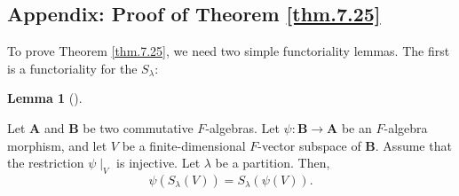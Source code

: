 \documentclass[numbers=enddot,12pt,final,onecolumn,notitlepage]{scrartcl}%
\numberwithin{exer}{section}
\theoremstyle{definition}
\newtheorem{lem}[theo]{Lemma}
\newenvironment{lemma}[1][]
{\begin{lem}[#1]\begin{leftbar}}
{\end{leftbar}\end{lem}}
\theoremstyle{plainsl}
\begin{document}
\subsection{\label{sec.apx-orig-7.25}Appendix: Proof of Theorem \ref{thm.7.25}%
}

To prove Theorem \ref{thm.7.25}, we need two simple functoriality lemmas. The
first is a functoriality for the $S_{\lambda}$:

\begin{lemma}
\label{lem.funcS}Let $\mathbf{A}$ and $\mathbf{B}$ be two commutative
$F$-algebras. Let $\psi:\mathbf{B}\rightarrow\mathbf{A}$ be an $F$-algebra
morphism, and let $V$ be a finite-dimensional $F$-vector subspace of
$\mathbf{B}$. Assume that the restriction $\psi\mid_{V}$ is injective. Let
$\lambda$ be a partition. Then,%
\[
\psi\left(  S_{\lambda}\left(  V\right)  \right)  =S_{\lambda}\left(
\psi\left(  V\right)  \right)  .
\]

\end{lemma}
\end{document}
